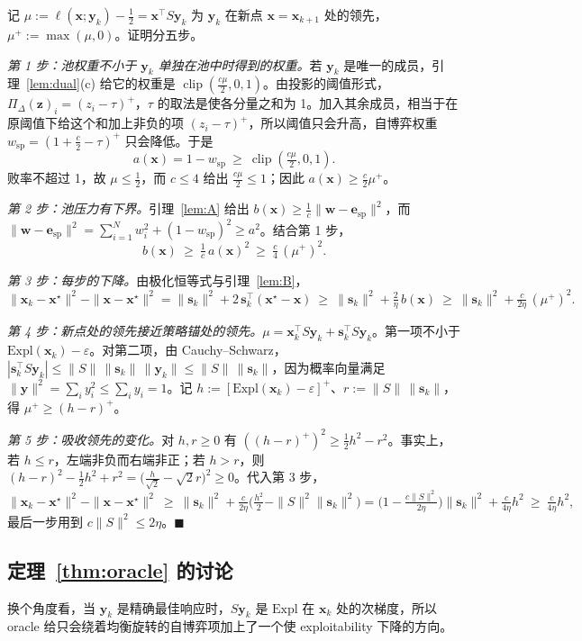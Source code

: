 \documentclass{article}
\theoremstyle{plain}
\theoremstyle{remark}
\newcommand{\Expl}{\mathrm{Expl}}
\newcommand{\Proj}{\Pi}
\newcommand{\simplex}{\Delta}
\newcommand{\bx}{{\bm{x}}}
\newcommand{\by}{{\bm{y}}}
\newcommand{\bw}{{\bm{w}}}
\newcommand{\bz}{{\bm{z}}}
\newcommand{\be}{{\bm{e}}}
\newcommand{\xs}{\bx^{\star}}
\newcommand{\dx}{{\bm{s}}}
\newcommand{\esp}{\be_{\mathrm{sp}}}
\newcommand{\wsp}{w_{\mathrm{sp}}}
\begin{document}
记 $\mu:=\ell(\bx;\by_k)-\tfrac12=\bx^\top S\by_k$ 为 $\by_k$ 在新点 $\bx=\bx_{k+1}$ 处的领先，$\mu^+:=\max(\mu,0)$。证明分五步。

\textit{第 1 步：池权重不小于 $\by_k$ 单独在池中时得到的权重。}若 $\by_k$ 是唯一的成员，引理~\ref{lem:dual}(c) 给它的权重是 $\operatorname{clip}(\tfrac{c\mu}2,0,1)$。由投影的阈值形式，$\Proj_\simplex(\bz)_i=(z_i-\tau)^+$，$\tau$ 的取法是使各分量之和为 1。加入其余成员，相当于在原阈值下给这个和加上非负的项 $(z_i-\tau)^+$，所以阈值只会升高，自博弈权重 $\wsp=(1+\tfrac c2-\tau)^+$ 只会降低。于是
\[
a(\bx)=1-\wsp\ \ge\ \operatorname{clip}(\tfrac{c\mu}2,0,1).
\]
败率不超过 1，故 $\mu\le\tfrac12$，而 $c\le4$ 给出 $\tfrac{c\mu}2\le1$；因此 $a(\bx)\ge\tfrac c2\mu^+$。

\textit{第 2 步：池压力有下界。}引理~\ref{lem:A} 给出 $b(\bx)\ge\tfrac1c\|\bw-\esp\|^2$，而 $\|\bw-\esp\|^2=\sum_{i=1}^Nw_i^2+(1-\wsp)^2\ge a^2$。结合第 1 步，
\[
b(\bx)\ \ge\ \tfrac1c\,a(\bx)^2\ \ge\ \tfrac c4\,(\mu^+)^2 .
\]

\textit{第 3 步：每步的下降。}由极化恒等式与引理~\ref{lem:B}，
\[
\|\bx_k-\xs\|^2-\|\bx-\xs\|^2=\|\dx_k\|^2+2\,\dx_k^\top(\xs-\bx)\ \ge\ \|\dx_k\|^2+\tfrac2\eta\,b(\bx)\ \ge\ \|\dx_k\|^2+\tfrac{c}{2\eta}\,(\mu^+)^2 .
\]

\textit{第 4 步：新点处的领先接近策略锚处的领先。}$\mu=\bx_k^\top S\by_k+\dx_k^\top S\by_k$。第一项不小于 $\Expl(\bx_k)-\varepsilon$。对第二项，由 Cauchy--Schwarz，$|\dx_k^\top S\by_k|\le\|S\|\,\|\dx_k\|\,\|\by_k\|\le\|S\|\,\|\dx_k\|$，因为概率向量满足 $\|\by\|^2=\sum_iy_i^2\le\sum_iy_i=1$。记 $h:=[\Expl(\bx_k)-\varepsilon]^+$、$r:=\|S\|\,\|\dx_k\|$，得 $\mu^+\ge(h-r)^+$。

\textit{第 5 步：吸收领先的变化。}对 $h,r\ge0$ 有 $((h-r)^+)^2\ge\tfrac12h^2-r^2$。事实上，若 $h\le r$，左端非负而右端非正；若 $h>r$，则 $(h-r)^2-\tfrac12h^2+r^2=\big(\tfrac{h}{\sqrt2}-\sqrt2r\big)^2\ge0$。代入第 3 步，
\[
\|\bx_k-\xs\|^2-\|\bx-\xs\|^2\ \ge\ \|\dx_k\|^2+\tfrac{c}{2\eta}\Big(\tfrac{h^2}2-\|S\|^2\|\dx_k\|^2\Big)=\Big(1-\tfrac{c\|S\|^2}{2\eta}\Big)\|\dx_k\|^2+\tfrac{c}{4\eta}h^2\ \ge\ \tfrac{c}{4\eta}h^2 ,
\]
最后一步用到 $c\|S\|^2\le2\eta$。\hfill$\blacksquare$

\subsection{定理~\ref{thm:oracle} 的讨论}
\label{app:oracle-discussion}

换个角度看，当 $\by_k$ 是精确最佳响应时，$S\by_k$ 是 $\Expl$ 在 $\bx_k$ 处的次梯度，所以 oracle 给只会绕着均衡旋转的自博弈项加上了一个使 exploitability 下降的方向。
\end{document}
